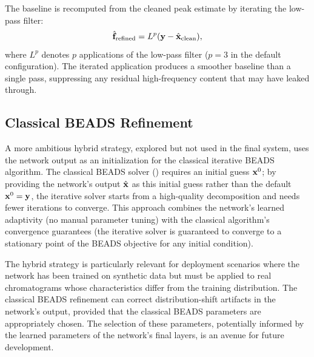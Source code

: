 The baseline is recomputed from the cleaned peak estimate by iterating the low-pass filter:
\begin{equation}
    \hat{\mathbf{f}}_{\text{refined}} = L^p(\mathbf{y} - \hat{\mathbf{x}}_{\text{clean}}),
    \label{eq:refined_baseline}
\end{equation}
where $L^p$ denotes $p$ applications of the low-pass filter ($p = 3$ in the default configuration). The iterated application produces a smoother baseline than a single pass, suppressing any residual high-frequency content that may have leaked through.



\subsection{Classical BEADS Refinement}
\label{sec:method_classical_refinement}

A more ambitious hybrid strategy, explored but not used in the final system, uses the network output as an initialization for the classical iterative BEADS algorithm. The classical BEADS solver () requires an initial guess $\mathbf{x}^0$; by providing the network's output $\hat{\mathbf{x}}$ as this initial guess rather than the default $\mathbf{x}^0 = \mathbf{y}$, the iterative solver starts from a high-quality decomposition and needs fewer iterations to converge. This approach combines the network's learned adaptivity (no manual parameter tuning) with the classical algorithm's convergence guarantees (the iterative solver is guaranteed to converge to a stationary point of the BEADS objective for any initial condition).

The hybrid strategy is particularly relevant for deployment scenarios where the network has been trained on synthetic data but must be applied to real chromatograms whose characteristics differ from the training distribution. The classical BEADS refinement can correct distribution-shift artifacts in the network's output, provided that the classical BEADS parameters are appropriately chosen. The selection of these parameters, potentially informed by the learned parameters of the network's final layers, is an avenue for future development.

